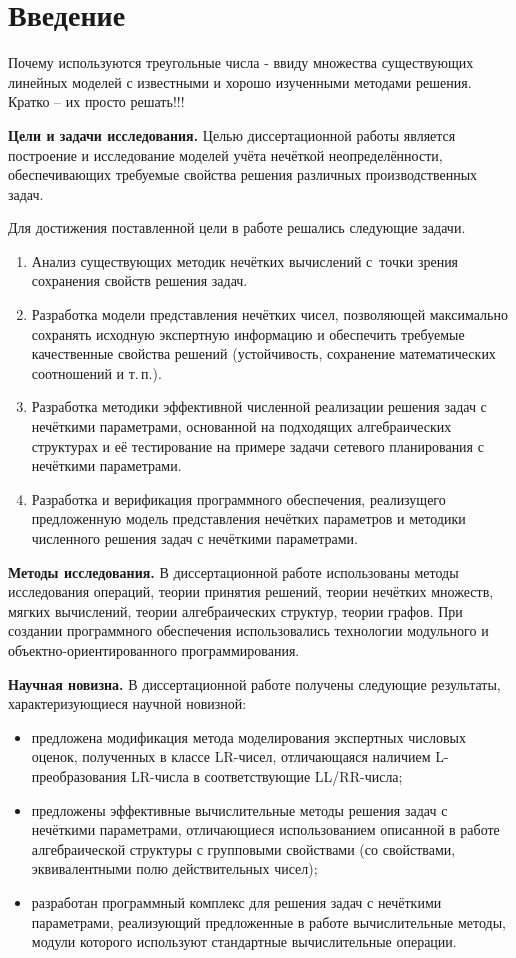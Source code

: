\chapter*{Введение}

Почему используются треугольные числа - ввиду множества существующих линейных моделей с известными и хорошо изученными методами решения. Кратко – их просто решать!!!

\textbf{Цели и задачи исследования.} Целью диссертационной работы является построение и исследование моделей учёта нечёткой неопределённости, обеспечивающих требуемые свойства решения различных производственных задач.

Для достижения поставленной цели в работе решались следующие задачи.
\begin{enumerate}
  \item Анализ существующих методик нечётких вычислений с~точки зрения сохранения свойств решения задач.
  \item Разработка модели представления нечётких чисел, позволяющей максимально сохранять исходную экспертную информацию и обеспечить требуемые качественные свойства решений (устойчивость, сохранение математических соотношений и т.\,п.).
  \item Разработка методики эффективной численной реализации решения задач с нечёткими параметрами, основанной на подходящих алгебраических структурах и её тестирование на примере задачи сетевого планирования с нечёткими параметрами.
  \item Разработка и верификация программного обеспечения, реализущего предложенную модель представления нечётких параметров и методики численного решения задач с нечёткими параметрами.
\end{enumerate}

\textbf{Методы исследования.} В диссертационной работе использованы методы исследования операций, теории принятия решений, теории нечётких множеств, мягких вычислений, теории алгебраических структур, теории графов. При создании программного обеспечения использовались технологии модульного и объектно-ориентированного программирования.

\textbf{Научная новизна.} В диссертационной работе получены следующие результаты, характеризующиеся научной новизной:
\begin{itemize}
  \item предложена модификация метода моделирования экспертных числовых оценок, полученных в классе LR-чисел, отличающаяся наличием L-преобразования LR-числа в соответствующие LL/RR-числа;
  \item предложены эффективные вычислительные методы решения задач с нечёткими параметрами, отличающиеся использованием описанной в работе алгебраической структуры с групповыми свойствами (со свойствами, эквивалентными полю действительных чисел);
  \item разработан программный комплекс для решения задач с нечёткими параметрами, реализующий предложенные в работе вычислительные методы, модули которого используют стандартные вычислительные операции.
\end{itemize}

